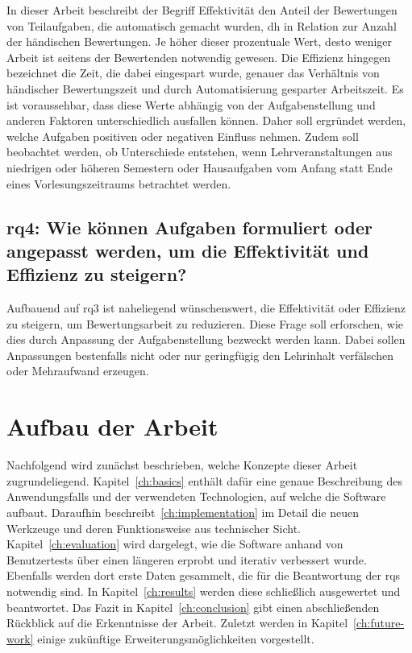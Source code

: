 In dieser Arbeit beschreibt der Begriff Effektivität den Anteil der Bewertungen von Teilaufgaben, die automatisch gemacht wurden, \ac{dh} in Relation zur Anzahl der händischen Bewertungen.
Je höher dieser prozentuale Wert, desto weniger Arbeit ist seitens der Bewertenden notwendig gewesen.
Die Effizienz hingegen bezeichnet die Zeit, die dabei eingespart wurde, genauer das Verhältnis von händischer Bewertungszeit und durch Automatisierung gesparter Arbeitszeit.
Es ist voraussehbar, dass diese Werte abhängig von der Aufgabenstellung und anderen Faktoren unterschiedlich ausfallen können.
Daher soll ergründet werden, welche Aufgaben positiven oder negativen Einfluss nehmen.
Zudem soll beobachtet werden, ob Unterschiede entstehen, wenn Lehrveranstaltungen aus niedrigen oder höheren Semestern oder Hausaufgaben vom Anfang statt Ende eines Vorlesungszeitraums betrachtet werden.

\subsection[\acs{rq}4]{\ac{rq}4: Wie können Aufgaben formuliert oder angepasst werden, um die Effektivität und Effizienz zu steigern?}\label{subsec:rq4-improve-effectivity-efficiency}

Aufbauend auf \acs{rq}3 ist naheliegend wünschenswert, die Effektivität oder Effizienz zu steigern, um Bewertungsarbeit zu reduzieren.
Diese Frage soll erforschen, wie dies durch Anpassung der Aufgabenstellung bezweckt werden kann.
Dabei sollen Anpassungen bestenfalls nicht oder nur geringfügig den Lehrinhalt verfälschen oder Mehraufwand erzeugen.

\section{Aufbau der Arbeit}\label{sec:structure}

Nachfolgend wird zunächst beschrieben, welche Konzepte dieser Arbeit zugrundeliegend.
Kapitel~\ref{ch:basics} enthält dafür eine genaue Beschreibung des Anwendungsfalls und der verwendeten Technologien, auf welche die Software aufbaut.
Daraufhin beschreibt~\ref{ch:implementation} im Detail die neuen Werkzeuge und deren Funktionsweise aus technischer Sicht.
Kapitel~\ref{ch:evaluation} wird dargelegt, wie die Software anhand von Benutzertests über einen längeren erprobt und iterativ verbessert wurde.
Ebenfalls werden dort erste Daten gesammelt, die für die Beantwortung der \acp{rq} notwendig sind.
In Kapitel~\ref{ch:results} werden diese schließlich ausgewertet und beantwortet.
Das Fazit in Kapitel~\ref{ch:conclusion} gibt einen abschließenden Rückblick auf die Erkenntnisse der Arbeit.
Zuletzt werden in Kapitel~\ref{ch:future-work} einige zukünftige Erweiterungsmöglichkeiten vorgestellt.
